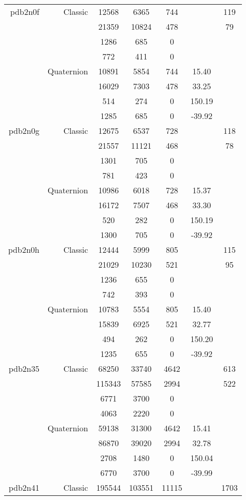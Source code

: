 \begin{xltabular}{\textwidth}{r|rcccSc}
pdb2n0f & Classic & 12568 & 6365 & 744 & & 119 \\
& & 21359 & 10824 & 478 & & 79 \\
& & 1286 & 685 & 0 & & \\
& & 772 & 411 & 0 & & \\
& Quaternion & 10891 & 5854 & 744 & 15.40 & \\
& & 16029 & 7303 & 478 & 33.25 & \\
& & 514 & 274 & 0 & 150.19 & \\
& & 1285 & 685 & 0 & -39.92 & \\ \addlinespace
pdb2n0g & Classic & 12675 & 6537 & 728 & & 118 \\
& & 21557 & 11121 & 468 & & 78 \\
& & 1301 & 705 & 0 & & \\
& & 781 & 423 & 0 & & \\
& Quaternion & 10986 & 6018 & 728 & 15.37 & \\
& & 16172 & 7507 & 468 & 33.30 & \\
& & 520 & 282 & 0 & 150.19 & \\
& & 1300 & 705 & 0 & -39.92 & \\ \addlinespace
pdb2n0h & Classic & 12444 & 5999 & 805 & & 115 \\
& & 21029 & 10230 & 521 & & 95 \\
& & 1236 & 655 & 0 & & \\
& & 742 & 393 & 0 & & \\
& Quaternion & 10783 & 5554 & 805 & 15.40 & \\
& & 15839 & 6925 & 521 & 32.77 & \\
& & 494 & 262 & 0 & 150.20 & \\
& & 1235 & 655 & 0 & -39.92 & \\ \addlinespace
pdb2n35 & Classic & 68250 & 33740 & 4642 & & 613 \\
& & 115343 & 57585 & 2994 & & 522 \\
& & 6771 & 3700 & 0 & & \\
& & 4063 & 2220 & 0 & & \\
& Quaternion & 59138 & 31300 & 4642 & 15.41 & \\
& & 86870 & 39020 & 2994 & 32.78 & \\
& & 2708 & 1480 & 0 & 150.04 & \\
& & 6770 & 3700 & 0 & -39.99 & \\ \addlinespace
pdb2n41 & Classic & 195544 & 103551 & 11115 & & 1703 \\

\end{xltabular}
